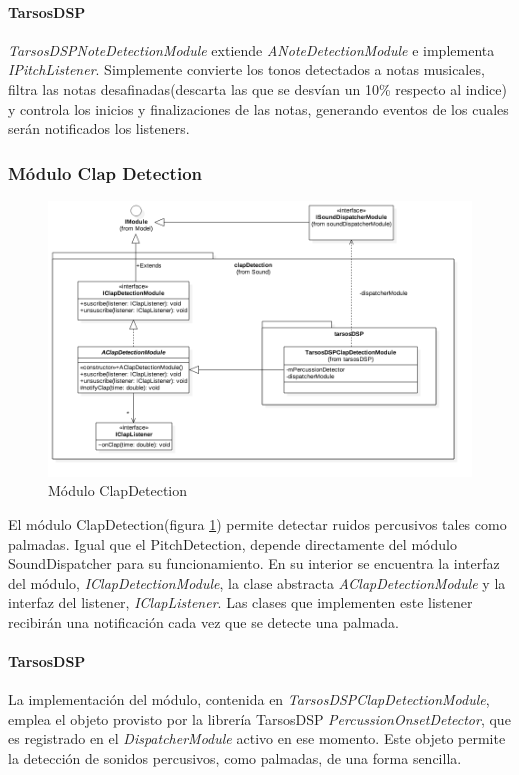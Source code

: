  \paragraph*{TarsosDSP\\}%
 
 \textit{TarsosDSPNoteDetectionModule} extiende \textit{ANoteDetectionModule} e implementa \textit{IPitchListener}. Simplemente convierte los tonos detectados a notas musicales, filtra las notas desafinadas(descarta las que se desvían un 10\% respecto al indice) y controla los inicios y finalizaciones de las notas, generando eventos de los cuales serán notificados los listeners.
 
\subsubsection{Módulo Clap Detection}
\begin{figure}
	\centering
	\includegraphics[width=1\linewidth]{imagenes/diagramas/ClapDetectionModule.png}
	\caption{Módulo ClapDetection}
	\label{fig:clap-detection-module}
\end{figure}
El módulo ClapDetection(figura \ref{fig:clap-detection-module}) permite detectar ruidos percusivos tales como palmadas. Igual que el PitchDetection, depende directamente del módulo SoundDispatcher para su funcionamiento. En su interior se encuentra la interfaz del módulo, \textit{IClapDetectionModule}, la clase abstracta \textit{AClapDetectionModule} y la interfaz del listener, \textit{IClapListener}. Las clases que implementen este listener recibirán una notificación cada vez que se detecte una palmada.
\paragraph*{TarsosDSP\\} 
La implementación del módulo, contenida en \textit{TarsosDSPClapDetectionModule}, emplea el objeto provisto por la librería TarsosDSP \textit{PercussionOnsetDetector}, que es registrado en el \textit{DispatcherModule} activo en ese momento. Este objeto permite la detección de sonidos percusivos, como palmadas, de una forma sencilla.

